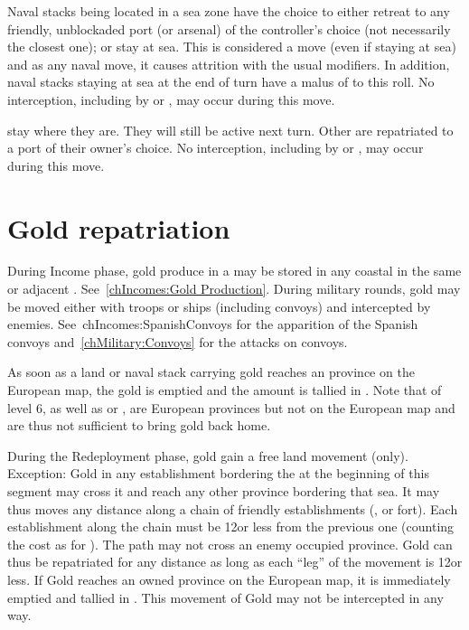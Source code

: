 \aparag[Navies]
\bparag Naval stacks being located in a sea zone have the choice to either
\bparag retreat to any friendly, unblockaded port (or arsenal) of the
controller's choice (not necessarily the closest one);
\bparag or stay at sea.
\bparag This is considered a move (even if staying at sea) and as any naval
move, it causes attrition with the usual modifiers.
\bparag In addition, naval stacks staying at sea at the end of turn have a
malus of  to this roll.
\bparag No interception, including by \Presidios or \StraitFort, may occur
during this move.

\bparag {} \corsaire stay where they are. They will still be
active next turn.
\bparag Other \corsaire are repatriated to a port of their owner's choice.
\bparag No interception, including by \Presidios or \StraitFort, may occur
during this move.



\section{Gold repatriation}\label{chRedep:Gold Repatriation}

\bparag[Income.] During Income phase, gold produce in a \COL may be stored in
any coastal \COL in the same or adjacent \Area. See~\ref{chIncomes:Gold
  Production}.
\bparag[Military.] During military rounds, gold may be moved either with
troops or ships (including convoys) and intercepted by
enemies. See~{chIncomes:SpanishConvoys} for the apparition of the Spanish
convoys and~\ref{chMilitary:Convoys} for the attacks on convoys.

\bparag As soon as a land or naval stack carrying gold reaches an province on
the European map, the gold is emptied and the amount is tallied in
.
\bparag Note that \COL of level 6, as well as \provinceAcores or
, are European provinces but not on the European map
and are thus not sufficient to bring gold back home.

\label{chRedep:Gold Transportation}
\bparag During the Redeployment phase, gold gain a free land movement (only).
\bparag Exception: Gold in any establishment bordering the \seazoneCaspienne
at the beginning of this segment may cross it and reach any other province
bordering that sea.
\bparag It may thus moves any distance along a chain of friendly
establishments (\COL, \TP or fort).
\bparag Each establishment along the chain must be 12\MP or less from the
previous one (counting the cost as for \LD).
\bparag The path may not cross an enemy occupied province.
\bparag Gold can thus be repatriated for any distance as long as each ``leg''
of the movement is 12\MP or less.
\bparag If Gold reaches an owned province on the European map, it is
immediately emptied and tallied in .
\bparag This movement of Gold may not be intercepted in any way.


